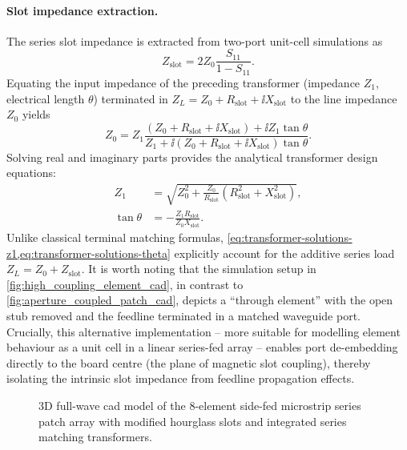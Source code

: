 \paragraph{Slot impedance extraction.}
The series slot impedance is extracted from two-port unit-cell simulations as
\begin{equation}
    \label{eq:z-slot-extraction}
    Z_{\mathrm{slot}} = 2 Z_{0} \frac{S_{11}}{1 - S_{11}}.
\end{equation}
Equating the input impedance of the preceding transformer (impedance $Z_1$, electrical length $\theta$) terminated in $Z_L = Z_0 + R_{\mathrm{slot}} + \ii X_{\mathrm{slot}}$ to the line impedance $Z_0$ yields
\begin{equation}
    \label{eq:transformer-input-impedance}
    Z_{0} = Z_{1} \frac{(Z_{0} + R_{\mathrm{slot}} + \ii X_{\mathrm{slot}}) + \ii Z_{1} \tan\theta}{Z_{1} + \ii (Z_{0} + R_{\mathrm{slot}} + \ii X_{\mathrm{slot}}) \tan\theta}.
\end{equation}
Solving real and imaginary parts provides the analytical transformer design equations:
\begin{align}
    \label{eq:transformer-solutions-z1}
    Z_{1} &= \sqrt{Z_{0}^2 + \frac{Z_{0}}{R_{\mathrm{slot}}} ( R_{\mathrm{slot}}^2 + X_{\mathrm{slot}}^2 ) }, \\
    \label{eq:transformer-solutions-theta}
    \tan\theta &= -\frac{Z_{1} R_{\mathrm{slot}}}{Z_{0} X_{\mathrm{slot}}}.
\end{align}
Unlike classical terminal matching formulas, \cref{eq:transformer-solutions-z1,eq:transformer-solutions-theta} explicitly account for the additive series load $Z_L = Z_0 + Z_{\text{slot}}$.
It is worth noting that the simulation setup in \cref{fig:high_coupling_element_cad}, in contrast to \cref{fig:aperture_coupled_patch_cad}, depicts a \enquote{through element} with the open stub removed and the feedline terminated in a matched waveguide port.
Crucially, this alternative implementation -- more suitable for modelling element behaviour as a unit cell in a linear series-fed array -- enables port de-embedding directly to the board centre (the plane of magnetic slot coupling), thereby isolating the intrinsic slot impedance from feedline propagation effects.

\begin{figure}[!ht]
    \centering
    
    \caption{3D full-wave \gls{cad} model of the 8-element side-fed microstrip series patch array with modified hourglass slots and integrated series matching transformers.}
    \label{fig:side_fed_microstrip_array_cad}
\end{figure}

